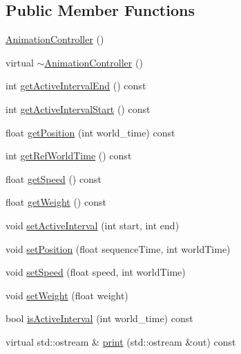 \subsection*{Public Member Functions}
\begin{CompactItemize}
\item 
\hyperlink{classm3g_1_1AnimationController_f2e8cb2c6c916983d0f87140c7b0c98e}{AnimationController} ()
\item 
virtual \hyperlink{classm3g_1_1AnimationController_346849d0f82278f30dda9f35f80e9dbe}{$\sim$AnimationController} ()
\item 
int \hyperlink{classm3g_1_1AnimationController_7caa95c7ed5a03844abe328feaae4911}{getActiveIntervalEnd} () const 
\item 
int \hyperlink{classm3g_1_1AnimationController_c66e837ae4152477eabdfcbe7fb21adb}{getActiveIntervalStart} () const 
\item 
float \hyperlink{classm3g_1_1AnimationController_dfdea73153cb34c26979575efda149e2}{getPosition} (int world\_\-time) const 
\item 
int \hyperlink{classm3g_1_1AnimationController_103e1bd81eba2cc90f31e7fdc4f3c601}{getRefWorldTime} () const 
\item 
float \hyperlink{classm3g_1_1AnimationController_4ab87c5df7c3eadd17b318a426773fcb}{getSpeed} () const 
\item 
float \hyperlink{classm3g_1_1AnimationController_a17d38dafd3d75c59f0609f037fbe5ae}{getWeight} () const 
\item 
void \hyperlink{classm3g_1_1AnimationController_a4cba877288d7a188477e0a756fd2f58}{setActiveInterval} (int start, int end)
\item 
void \hyperlink{classm3g_1_1AnimationController_a20a5553bd449b21bad74666055626f0}{setPosition} (float sequenceTime, int worldTime)
\item 
void \hyperlink{classm3g_1_1AnimationController_403dae9658751ff86becd82d8a6477f2}{setSpeed} (float speed, int worldTime)
\item 
void \hyperlink{classm3g_1_1AnimationController_8859df4d5a61714012bf9e1240189aed}{setWeight} (float weight)
\item 
bool \hyperlink{classm3g_1_1AnimationController_8db30a5f125f5b22a1cde9e41d93c2f0}{isActiveInterval} (int world\_\-time) const 
\item 
virtual std::ostream \& \hyperlink{classm3g_1_1AnimationController_6fea17fa1532df3794f8cb39cb4f911f}{print} (std::ostream \&out) const 
\end{CompactItemize}



